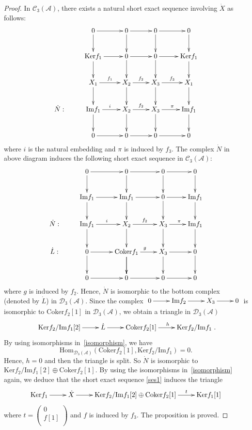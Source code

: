 \documentclass{amsart}
\theoremstyle{definition}
\numberwithin{equation}{section}
\begin{document}
\begin{proof}
In $\mathcal{C}_3(\mathcal{A})$, there exists a natural short exact
sequence involving $\dot{X}$ as follows:
\begin{equation}\label{ses1} \xymatrix{
&0\ar[r]\ar[d]&0\ar[r]\ar[d]&0\ar[r]\ar[d]&0\ar[d]\\
&\mathrm{Ker}f_1\ar[r]\ar[d]&0\ar[r]\ar[d]&0\ar[r]\ar[d]&\mathrm{Ker}f_1\ar[d]\\
&X_1\ar[r]^{f_1}\ar[d]&X_2\ar[r]^{f_2}\ar[d]&X_3\ar[r]^{f_3}\ar[d]&X_1\ar[d]\\
\dot{N}:&\mathrm{Im}f_1\ar[r]^{i}\ar[d]&X_2\ar[r]^{f_2}\ar[d]&X_3\ar[r]^{\pi}\ar[d]&\mathrm{Im}f_1\ar[d]\\
&0\ar[r]&0\ar[r]&0\ar[r]&0}
\end{equation}
where $i$ is the natural embedding and $\pi$ is induced by $f_3.$
The complex $\dot{N}$ in above diagram induces the following short
exact sequence in $\mathcal{C}_3(\mathcal{A})$:
$$
\xymatrix{&0\ar[r]\ar[d]&0\ar[r]\ar[d]&0\ar[r]\ar[d]&0\ar[d]\\
&\mathrm{Im}f_1\ar[r]\ar[d]&\mathrm{Im}f_1\ar[r]\ar[d]&0\ar[r]\ar[d]&\mathrm{Im}f_1\ar[d]\\
\dot{N}:&\mathrm{Im}f_1\ar[r]^{i}\ar[d]&X_2\ar[r]^{f_2}\ar[d]&X_3\ar[r]^{\pi}\ar[d]&\mathrm{Im}f_1\ar[d]\\
\dot{L}:&0\ar[r]\ar[d]&\mathrm{Coker}f_1 \ar[d]\ar[r]^{g} \ar[d]&X_3\ar[r]\ar[d]&0 \ar[d]\\
&0\ar[r]&0\ar[r]&0\ar[r]&0}
$$
where $g$ is induced by $f_2.$ Hence, $\dot{N}$ is isomorphic to the
bottom complex (denoted by $\dot{L}$) in ${{\mathcal{D}}}_3(\mathcal{A})$. Since
the complex $\xymatrix{0\ar[r]&\mathrm{Im}f_2\ar[r]&X_3\ar[r]&0}$ is
isomorphic to $\mathrm{Coker}f_2[1]$ in ${{\mathcal{D}}}_3(\mathcal{A})$, we
obtain a triangle in ${{\mathcal{D}}}_3(\mathcal{A})$
$$
\xymatrix{\mathrm{Ker}f_2/\mathrm{Im}f_1[2]\ar[r]&\dot{L}\ar[r]&\mathrm{Coker}f_2[1]\ar[r]^{h}&\mathrm{Ker}f_2/\mathrm{Im}f_1}.
$$
By using isomorphisms in~\eqref{isomorphism}, we have
$$
{\mathrm{Hom}}_{{{\mathcal{D}}}_3(\mathcal{A})}(\mathrm{Coker}f_2[1],
\mathrm{Ker}f_2/\mathrm{Im}f_1)=0.
$$
Hence, $h=0$ and then the triangle is split. So $\dot{N}$ is
isomorphic to $\mathrm{Ker}f_2/\mathrm{Im}f_1[2]\oplus
\mathrm{Coker}f_2[1].$ By using the isomorphisms
in~\eqref{isomorphism} again, we deduce that the short exact
sequence \eqref{ses1} induces the triangle
$$
\xymatrix{\mathrm{Ker}f_1\ar[r]&\dot{X}\ar[r]&\mathrm{Ker}f_2/\mathrm{Im}f_1[2]\oplus
\mathrm{Coker}f_2[1]\ar[r]^-{t}&\mathrm{Ker}f_1[1]}
$$
where $t=\left(
           \begin{array}{c}
             0 \\
             f[1] \\
           \end{array}
         \right)
$ and $f$ is induced by $f_3.$ The proposition is proved.
\end{proof}
\end{document}
